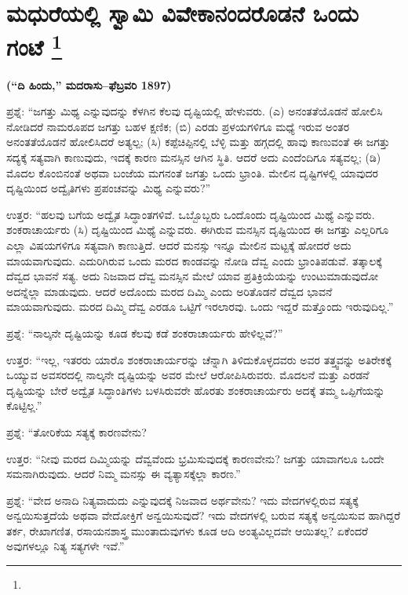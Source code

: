
\chapter[ಮಧುರೆಯಲ್ಲಿ ಸ್ವಾಮಿ ವಿವೇಕಾನಂದರೊಡನೆ ಒಂದು ಗಂಟೆ ]{ಮಧುರೆಯಲ್ಲಿ ಸ್ವಾಮಿ ವಿವೇಕಾನಂದರೊಡನೆ ಒಂದು ಗಂಟೆ \protect\footnote{}}

\centerline{\textbf{(“ದಿ ಹಿಂದು,” ಮದರಾಸು–ಫೆಬ್ರವರಿ 1897)}}

ಪ್ರಶ್ನೆ: “ಜಗತ್ತು ಮಿಥ್ಯ ಎನ್ನುವುದನ್ನು ಕೆಳಗಿನ ಕೆಲವು ದೃಷ್ಟಿಯಲ್ಲಿ ಹೇಳುವರು. (ಎ) ಅನಂತತೆಯೊಡನೆ ಹೋಲಿಸಿ ನೋಡಿದರೆ ನಾಮರೂಪದ ಜಗತ್ತು ಬಹಳ ಕ್ಷಣಿಕ; (ಬಿ) ಎರಡು ಪ್ರಳಯಗಳಿಗೂ ಮಧ್ಯೆ ಇರುವ ಅಂತರ ಅನಂತತೆಯೊಡನೆ ಹೋಲಿಸಿದರೆ ಅತ್ಯಲ್ಪ; (ಸಿ) ಕಪ್ಪೆಚಿಪ್ಪಿನಲ್ಲಿ ಬೆಳ್ಳಿ ಮತ್ತು ಹಗ್ಗದಲ್ಲಿ ಹಾವು ಕಾಣುವಂತೆ ಈ ಜಗತ್ತು ಸದ್ಯಕ್ಕೆ ಸತ್ಯವಾಗಿ ಕಾಣುವುದು, ಇದಕ್ಕೆ ಕಾರಣ ಮನಸ್ಸಿನ ಆಗಿನ ಸ್ಥಿತಿ. ಆದರೆ ಅದು ಎಂದೆಂದಿಗೂ ಸತ್ಯವಲ್ಲ; (ಡಿ) ಮೊದಲ ಕೊಂಬಿನಂತೆ ಅಥವಾ ಬಂಜೆಯ ಮಗನಂತೆ ಜಗತ್ತು ಒಂದು ಭ್ರಾಂತಿ. ಮೇಲಿನ ದೃಷ್ಟಿಗಳಲ್ಲಿ ಯಾವುದರ ದೃಷ್ಟಿಯಿಂದ ಅದ್ವೈತಿಗಳು ಪ್ರಪಂಚವನ್ನು ಮಿಥ್ಯ ಎನ್ನುವರು?”

\vskip 3pt

ಉತ್ತರ: “ಹಲವು ಬಗೆಯ ಅದ್ವೈತ ಸಿದ್ಧಾಂತಗಳಿವೆ. ಒಬ್ಬೊಬ್ಬರು ಒಂದೊಂದು ದೃಷ್ಟಿಯಿಂದ ಮಿಥ್ಯೆ ಎನ್ನುವರು. ಶಂಕರಾಚಾರ್ಯರು (ಸಿ) ದೃಷ್ಟಿಯಿಂದ ಮಿಥ್ಯೆ ಎನ್ನುವರು. ಈಗಿರುವ ಮನಸ್ಸಿನ ದೃಷ್ಟಿಯಿಂದ ಈ ಜಗತ್ತು ಎಲ್ಲರಿಗೂ ಎಲ್ಲಾ ವಿಷಯಗಳಿಗೂ ಸತ್ಯವಾಗಿ ಕಾಣುತ್ತಿದೆ. ಆದರೆ ಮನಸ್ಸು ಇನ್ನೂ ಮೇಲಿನ ಮಟ್ಟಕ್ಕೆ ಹೋದರೆ ಅದು ಮಾಯವಾಗುವುದು. ಎದುರಿಗಿರುವ ಒಂದು ಮರದ ಕಾಂಡವನ್ನು ನೋಡಿ ದೆವ್ವ ಎಂದು ಭ್ರಾಂತಿಪಡುವೆ. ತತ್ಕಾಲಕ್ಕೆ ದೆವ್ವದ ಭಾವನೆ ಸತ್ಯ. ಅದು ನಿಜವಾದ ದೆವ್ವ ಮನಸ್ಸಿನ ಮೇಲೆ ಯಾವ ಪ್ರತಿಕ್ರಿಯೆಯನ್ನು ಉಂಟುಮಾಡುವುದೋ ಅದನ್ನೆಲ್ಲಾ ಮಾಡುವುದು. ಆದರೆ ಅದೊಂದು ಮರದ ದಿಮ್ಮಿ ಎಂದು ಅರಿತೊಡನೆ ದೆವ್ವದ ಭಾವನೆ ಮಾಯವಾಗುವುದು. ಮರದ ದಿಮ್ಮಿ ದೆವ್ವ ಎರಡೂ ಒಟ್ಟಿಗೆ ಇರಲಾರವು. ಒಂದು ಇದ್ದರೆ ಮತ್ತೊಂದು ಇರುವುದಿಲ್ಲ.”

\vskip 3pt

ಪ್ರಶ್ನೆ: “ನಾಲ್ಕನೇ ದೃಷ್ಟಿಯನ್ನು ಕೂಡ ಕೆಲವು ಕಡೆ ಶಂಕರಾಚಾರ್ಯರು ಹೇಳಿಲ್ಲವೆ?”

\vskip 3pt

ಉತ್ತರ: “ಇಲ್ಲ, ಇತರರು ಯಾರೊ ಶಂಕರಾಚಾರ್ಯರನ್ನು ಚೆನ್ನಾಗಿ ತಿಳಿದುಕೊಳ್ಳ\-ದವರು ಅವರ ತತ್ತ್ವವನ್ನು ಅತಿರೇಕಕ್ಕೆ ಒಯ್ಯುವ ಅವಸರದಲ್ಲಿ ನಾಲ್ಕನೇ ದೃಷ್ಟಿಯನ್ನು ಅವರ ಮೇಲೆ ಆರೋಪಿಸಿರುವರು. ಮೊದಲನೆ ಮತ್ತು ಎರಡನೆ ದೃಷ್ಟಿಯನ್ನು ಬೇರೆ ಅದ್ವೈತ ಸಿದ್ಧಾಂತಿಗಳು ಬಳಸಿರುವರೇ ಹೊರತು ಶಂಕರಾಚಾರ್ಯರು ಅದಕ್ಕೆ ತಮ್ಮ ಒಪ್ಪಿಗೆಯನ್ನು ಕೊಟ್ಟಿಲ್ಲ.”

\vskip 3pt

ಪ್ರಶ್ನೆ: “ತೋರಿಕೆಯ ಸತ್ಯಕ್ಕೆ ಕಾರಣವೇನು?

\vskip 3pt

ಉತ್ತರ: “ನೀವು ಮರದ ದಿಮ್ಮಿಯನ್ನು ದೆವ್ವವೆಂದು ಭ್ರಮಿಸುವುದಕ್ಕೆ ಕಾರಣವೇನು? ಜಗತ್ತು ಯಾವಾಗಲೂ ಒಂದೇ ಸಮನಾಗಿರುವುದು. ಆದರೆ ನಿಮ್ಮ ಮನಸ್ಸು ಈ ವ್ಯತ್ಯಾಸಕ್ಕೆಲ್ಲಾ ಕಾರಣ.”

\eject

ಪ್ರಶ್ನೆ: “ವೇದ ಅನಾದಿ ನಿತ್ಯವಾದುದು ಎನ್ನುವುದಕ್ಕೆ ನಿಜವಾದ ಅರ್ಥವೇನು? ಇದು ವೇದಗಳಲ್ಲಿರುವ ಸತ್ಯಕ್ಕೆ ಅನ್ವಯಿಸುತ್ತದೆಯೆ ಅಥವಾ ವೇದೋಕ್ತಿಗೆ ಅನ್ವಯಿಸುವುದೆ? ಇದು ವೇದಗಳಲ್ಲಿ ಬರುವ ಸತ್ಯಕ್ಕೆ ಅನ್ವಯಿಸುವ ಹಾಗಿದ್ದರೆ ತರ್ಕ, ರೇಖಾಗಣಿತ, ರಸಾಯನಶಾಸ್ತ್ರ ಮುಂತಾದುವುಗಳು ಕೂಡ ಆದಿ ಅಂತ್ಯವಿಲ್ಲದವೇ ಆಯಿತಲ್ಲ? ಏಕೆಂದರೆ ಅವುಗಳಲ್ಲೂ ನಿತ್ಯ ಸತ್ಯಗಳೇ ಇವೆ.”

